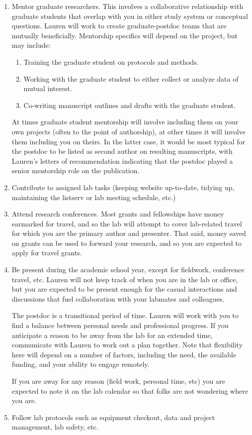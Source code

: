 \documentclass[12pt]{article}
\begin{document}
\begin{enumerate}
\item Mentor graduate researchers. This involves a collaborative relationship with graduate students that overlap with you in either study system or conceptual questions. Lauren will work to create graduate-postdoc teams that are mutually beneficially. Mentorship specifics will depend on the project, but may include:

\begin{enumerate}
\item Training the graduate student on protocols and methods.
\item Working with the graduate student to either collect or analyze data of mutual interest.
\item Co-writing manuscript outlines and drafts with the graduate student.
\end{enumerate}

At times graduate student mentorship will involve including them on your own projects (often to the point of authorship), at other times it will involve them including you on theirs. In the latter case, it would be most typical for the postdoc to be listed as second author on resulting manuscripts, with Lauren's letters of recommendation indicating that the postdoc played a senior mentorship role on the publication.

\item Contribute to assigned lab tasks (keeping website up-to-date, tidying up, maintaining the listserv or lab meeting schedule, etc.)

\item Attend research conferences. Most grants and fellowships have money earmarked for travel, and so the lab will attempt to cover lab-related travel for which you are the primary author and presenter. That said, money saved on grants can be used to forward your research, and so you are expected to apply for travel grants.
  
\item Be present during the academic school year, except for fieldwork, conference travel, etc. Lauren will not keep track of when you are in the lab or office, but you are expected to be present enough for the casual interactions and discussions that fuel collaboration with your labmates and colleagues.  

The postdoc is a transitional period of time. Lauren will work with you to find a balance between personal needs and professional progress. If you anticipate a reason to be away from the lab for an extended time, communicate with Lauren to work out a plan together. Note that flexibility here will depend on a number of factors, including the need, the available funding, and your ability to engage remotely.
  
If you are away for any reason (field work, personal time, etc) you are expected to note it on the lab calendar so that folks are not wondering where you are. 

\item Follow lab protocols such as equipment checkout, data and project management, lab safety, etc.

\end{enumerate}
\end{document}
